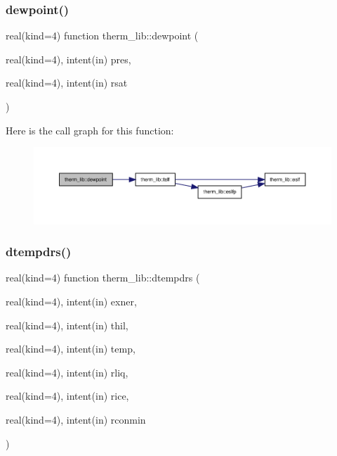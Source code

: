 \subsubsection{\texorpdfstring{dewpoint()}{dewpoint()}}
{\footnotesize\ttfamily real(kind=4) function therm\+\_\+lib\+::dewpoint (\begin{DoxyParamCaption}\item[{real(kind=4), intent(in)}]{pres,  }\item[{real(kind=4), intent(in)}]{rsat }\end{DoxyParamCaption})}

Here is the call graph for this function\+:
\nopagebreak
\begin{figure}[H]
\begin{center}
\leavevmode
\includegraphics[width=350pt]{namespacetherm__lib_a4a7268a45c9e0384a7711ec8b1d2b24e_cgraph}
\end{center}
\end{figure}
\mbox{\label{namespacetherm__lib_a98f9f548762461093dfbe7604fcc5601}} 
\subsubsection{\texorpdfstring{dtempdrs()}{dtempdrs()}}
{\footnotesize\ttfamily real(kind=4) function therm\+\_\+lib\+::dtempdrs (\begin{DoxyParamCaption}\item[{real(kind=4), intent(in)}]{exner,  }\item[{real(kind=4), intent(in)}]{thil,  }\item[{real(kind=4), intent(in)}]{temp,  }\item[{real(kind=4), intent(in)}]{rliq,  }\item[{real(kind=4), intent(in)}]{rice,  }\item[{real(kind=4), intent(in)}]{rconmin }\end{DoxyParamCaption})}

